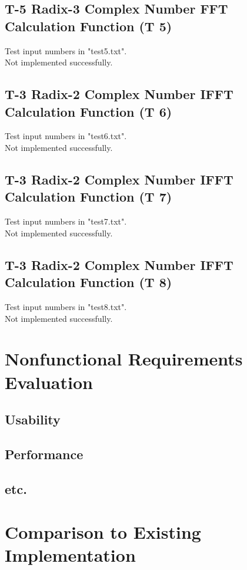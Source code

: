 \documentclass[12pt, titlepage]{article}
\begin{document}
\subsection {T-5 Radix-3 Complex Number FFT Calculation Function  (T 5)}
Test input numbers in "test5.txt".  \\
Not implemented successfully.
\subsection {T-3 Radix-2 Complex Number IFFT Calculation Function  (T 6)}
Test input numbers in "test6.txt". \\
Not implemented successfully.
\subsection {T-3 Radix-2 Complex Number IFFT Calculation Function (T 7)}
Test input numbers in "test7.txt".  \\
Not implemented successfully.
\subsection {T-3 Radix-2 Complex Number IFFT Calculation Function (T 8)}
Test input numbers in "test8.txt". \\
Not implemented successfully.

\section{Nonfunctional Requirements Evaluation}
\subsection{Usability}
		
\subsection{Performance}

\subsection{etc.}
	
\section{Comparison to Existing Implementation}	
\end{document}
